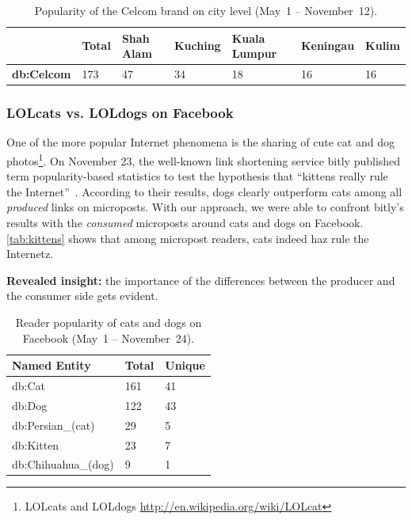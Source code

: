 \documentclass{iosart2c}
\begin{document}
\begin{table}
    \begin{tabular}{ | l | l | l | l | l | l | l |}
    \hline
	& \textbf{Total} & \textbf{Shah Alam} & \textbf{Kuching} & \textbf{Kuala Lumpur} & \textbf{Keningau} & \textbf{Kulim}\\ \hline
\textbf{db:Celcom} & 173 & 47 & 34 & 18 & 16 & 16\\
    \hline
  \end{tabular}
  \caption{Popularity of the Celcom brand on city level (May~1 -- November~12).}
  \label{tab:celcom}  
\end{table}

\subsubsection{LOLcats vs. LOLdogs on Facebook}
One of the more popular Internet phenomena is the sharing of cute cat and dog photos\footnote{LOLcats and LOLdogs \url{http://en.wikipedia.org/wiki/LOLcat}}.
On November 23, the well-known link shortening service bitly published term popularity-based statistics to test the hypothesis that ``kittens really rule the Internet''~\cite{kittens}.
According to their results, dogs clearly outperform cats among all \emph{produced} links on microposts.
With our approach, we were able to confront bitly's results with the \emph{consumed} microposts around cats and dogs on Facebook.
\autoref{tab:kittens} shows that among micropost readers, cats indeed haz rule the Internetz.

\textbf{Revealed insight:}
the importance of the differences between the producer and the consumer side gets evident.

\begin{table}
    \begin{tabular}{ | l | l | l |}
    \hline
	\textbf{Named Entity} & \textbf{Total} & \textbf{Unique} \\ \hline
	db:Cat & 161 & 41\\
	db:Dog & 122 & 43\\
	db:Persian\_(cat) &29 &5\\
	db:Kitten & 23 & 7\\
	db:Chihuahua\_(dog) & 9 & 1\\
    \hline
  \end{tabular}
  \caption{Reader popularity of cats and dogs on Facebook (May~1 -- November~24).}
  \label{tab:kittens}  
\end{table}
\end{document}
